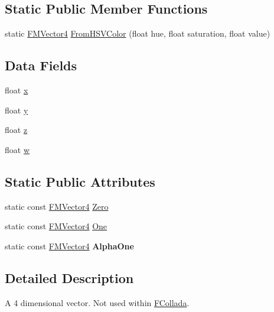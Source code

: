\subsection*{Static Public Member Functions}
\begin{DoxyCompactItemize}
\item 
static \hyperlink{classFMVector4}{FMVector4} \hyperlink{classFMVector4_a8cca8e1217107af6a800eab4e043f8b2}{FromHSVColor} (float hue, float saturation, float value)
\end{DoxyCompactItemize}
\subsection*{Data Fields}
\begin{DoxyCompactItemize}
\item 
float \hyperlink{classFMVector4_afe5d4e4d762d99547c6c4ba2e2f336db}{x}
\item 
float \hyperlink{classFMVector4_a36567c972039925e7ee11faa69ddd5ab}{y}
\item 
float \hyperlink{classFMVector4_aa86685f8bdb9b6ce80edd1b4424475b8}{z}
\item 
float \hyperlink{classFMVector4_a38311f6dd1139e792d6fad137572a82a}{w}
\end{DoxyCompactItemize}
\subsection*{Static Public Attributes}
\begin{DoxyCompactItemize}
\item 
static const \hyperlink{classFMVector4}{FMVector4} \hyperlink{classFMVector4_a98ad0940dc7826de03de889f947a3ef6}{Zero}
\item 
static const \hyperlink{classFMVector4}{FMVector4} \hyperlink{classFMVector4_ae76b0f45630d1c2ff5f14409c15357ac}{One}
\item 
\hypertarget{classFMVector4_a195a80f3291baf3180202b691eab4357}{
static const \hyperlink{classFMVector4}{FMVector4} {\bfseries AlphaOne}}
\label{classFMVector4_a195a80f3291baf3180202b691eab4357}

\end{DoxyCompactItemize}


\subsection{Detailed Description}
A 4 dimensional vector. Not used within \hyperlink{namespaceFCollada}{FCollada}. 

